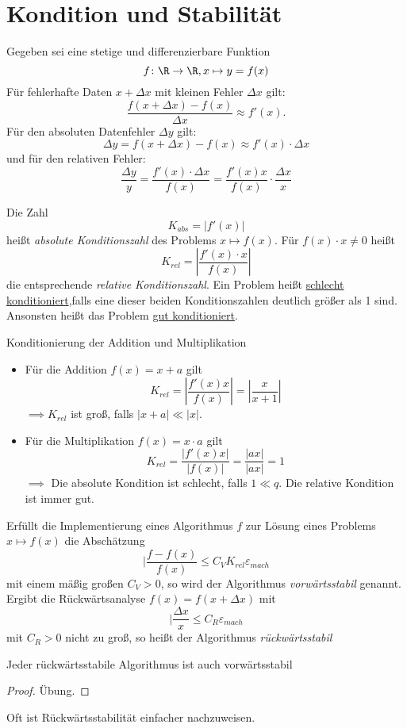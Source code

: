 \section{Kondition und Stabilität}
Gegeben sei eine stetige und differenzierbare Funktion
\[
f \colon \R \to \R, x \mapsto y = f(x) 
\]
Für fehlerhafte Daten $x+\Delta x$ mit kleinen Fehler $\Delta x$ gilt:
\[
\frac{f(x+\Delta x)-f(x)}{\Delta x} \approx f'(x)\text{.}
\]
Für den absoluten Datenfehler $\Delta y$ gilt:
\[
\Delta y= f(x+\Delta x)-f(x) \approx f'(x) \cdot \Delta x
\]
und für den relativen Fehler:
\[
\frac{\Delta y}{y}= \frac{f'(x)\cdot \Delta x}{f(x)}=\frac{f'(x)x}{f(x)}\cdot \frac{\Delta x}{x}
\]
\begin{definition}[Konditionszahlen]
\label{def:konditionszahl}
Die Zahl \[
K_{abs} = |f'(x)|\]
heißt \emph{absolute Konditionszahl} des Problems $x \mapsto f(x)$. 
Für $f(x)\cdot x \neq 0$ heißt
\[
K_{rel}=|\frac{f'(x) \cdot x}{f\left( x \right)}|\] 
die entsprechende \emph{relative Konditionszahl}.
Ein Problem heißt \underline{schlecht konditioniert},falls eine dieser beiden Konditionszahlen deutlich größer als 1 sind.
Ansonsten heißt das Problem \underline{gut konditioniert}.
\end{definition}
\begin{example}
Konditionierung der Addition und Multiplikation
\begin{itemize}
	\item Für die Addition $f(x)=x+a$ gilt
\[
K_{rel}= |\frac{f'(x)x}{f(x)}|= |\frac{x}{x+1}|
\]
$\implies K_{rel}$ ist groß, falls $|x+a| \ll |x|$.
\item Für die Multiplikation $f(x)=x \cdot a$ gilt
\[
K_{rel} = \frac{|f'(x)x|}{|f(x)|}= \frac{|ax|}{|ax|}=1
\]
$\implies$ Die absolute Kondition ist schlecht, falls $1 \ll q$. Die relative Kondition ist immer gut.
\end{itemize}
\end{example}
\begin{definition}
Erfüllt die Implementierung eines Algorithmus $\boxed{f}$ zur Lösung eines Problems $x \mapsto f(x)$ die Abschätzung
\[
|\frac{\boxed{f}-f(x)}{f(x)} \le C_V K_{rel} \varepsilon_{mach}
\]
mit einem mäßig großen $C_V >0$, so wird der Algorithmus \emph{vorwärtsstabil} genannt.
Ergibt die Rückwärtsanalyse $\boxed{f}(x)=f(x+\Delta x)$ mit
\[
|\frac{\Delta x}{x} \le C_R \varepsilon_{mach}
\]
mit $C_R>0$ nicht zu groß, so heißt der Algorithmus  \emph{rückwärtsstabil}

\end{definition}
\begin{theorem}
Jeder rückwärtsstabile Algorithmus ist auch vorwärtsstabil
\end{theorem}
\begin{proof}
Übung.
\end{proof}
Oft ist Rückwärtsstabilität einfacher nachzuweisen.

